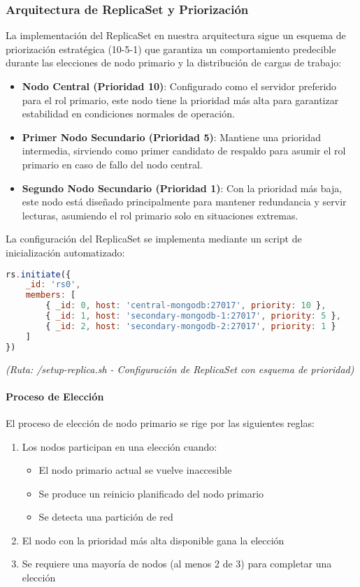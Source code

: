 \documentclass[12pt,letterpaper]{article}
\begin{document}
\subsubsection{Arquitectura de ReplicaSet y Priorización}
La implementación del ReplicaSet en nuestra arquitectura sigue un esquema de priorización estratégica (10-5-1) que garantiza un comportamiento predecible durante las elecciones de nodo primario y la distribución de cargas de trabajo:

\begin{itemize}
    \item \textbf{Nodo Central (Prioridad 10)}: Configurado como el servidor preferido para el rol primario, este nodo tiene la prioridad más alta para garantizar estabilidad en condiciones normales de operación.
    \item \textbf{Primer Nodo Secundario (Prioridad 5)}: Mantiene una prioridad intermedia, sirviendo como primer candidato de respaldo para asumir el rol primario en caso de fallo del nodo central.
    \item \textbf{Segundo Nodo Secundario (Prioridad 1)}: Con la prioridad más baja, este nodo está diseñado principalmente para mantener redundancia y servir lecturas, asumiendo el rol primario solo en situaciones extremas.
\end{itemize}

La configuración del ReplicaSet se implementa mediante un script de inicialización automatizado:

\begin{lstlisting}[language=javascript]
rs.initiate({
    _id: 'rs0',
    members: [
        { _id: 0, host: 'central-mongodb:27017', priority: 10 },
        { _id: 1, host: 'secondary-mongodb-1:27017', priority: 5 },
        { _id: 2, host: 'secondary-mongodb-2:27017', priority: 1 }
    ]
})
\end{lstlisting}
\textit{(Ruta: /setup-replica.sh - Configuración de ReplicaSet con esquema de prioridad)}

\paragraph{Proceso de Elección}
El proceso de elección de nodo primario se rige por las siguientes reglas:

\begin{enumerate}
    \item Los nodos participan en una elección cuando:
        \begin{itemize}
            \item El nodo primario actual se vuelve inaccesible
            \item Se produce un reinicio planificado del nodo primario
            \item Se detecta una partición de red
        \end{itemize}
    \item El nodo con la prioridad más alta disponible gana la elección
    \item Se requiere una mayoría de nodos (al menos 2 de 3) para completar una elección
\end{enumerate}
\end{document}
